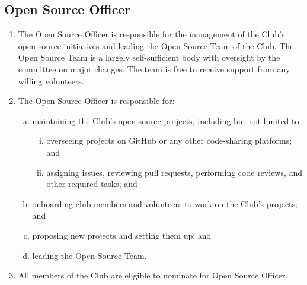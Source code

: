 \documentclass{schedule}
\begin{document}
\subsection{Open Source Officer}
\begin{enumerate}[(1)]
    \item The Open Source Officer is responsible for the management of the Club's open source initiatives and leading the Open Source Team of the Club. The Open Source Team is a largely self-sufficient body with oversight by the committee on major changes. The team is free to receive support from any willing volunteers.
    \item The Open Source Officer is responsible for:
          \begin{enumerate}[(a)]
              \item maintaining the Club's open source projects, including but not limited to:
                    \begin{enumerate}[(i)]
                        \item overseeing projects on GitHub or any other code-sharing platforms; and
                        \item assigning issues, reviewing pull requests, performing code reviews, and other required tasks; and
                    \end{enumerate}
              \item onboarding club members and volunteers to work on the Club's projects; and
              \item proposing new projects and setting them up; and
              \item leading the Open Source Team.
          \end{enumerate}
    \item All members of the Club are eligible to nominate for Open Source Officer.
\end{enumerate}
\end{document}
